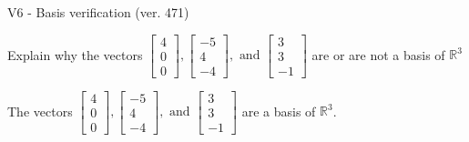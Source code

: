 \begin{exercise}
  \begin{exerciseTitle}V6 - Basis verification (ver. 471)\end{exerciseTitle}
  \begin{exerciseStatement}
    Explain why the vectors \(\left[\begin{array}{r}
4 \\
0 \\
0
\end{array}\right] , \left[\begin{array}{r}
-5 \\
4 \\
-4
\end{array}\right] , \text{ and } \left[\begin{array}{r}
3 \\
3 \\
-1
\end{array}\right]\) are or are not a basis of \(\mathbb{R}^3\)	


  \end{exerciseStatement}
  \begin{exerciseAnswer}
   The vectors \(\left[\begin{array}{r}
4 \\
0 \\
0
\end{array}\right] , \left[\begin{array}{r}
-5 \\
4 \\
-4
\end{array}\right] , \text{ and } \left[\begin{array}{r}
3 \\
3 \\
-1
\end{array}\right]\) 
  	 are  a basis of \(\mathbb{R}^3\).
  


  \end{exerciseAnswer}
\end{exercise}